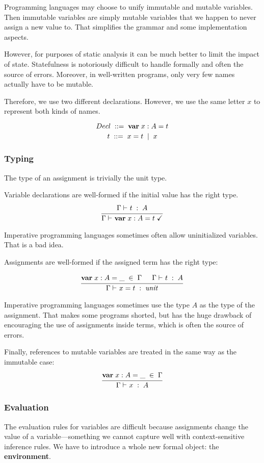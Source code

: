 Programming languages may choose to unify immutable and mutable variables.
Then immutable variables are simply mutable variables that we happen to never assign a new value to.
That simplifies the grammar and some implementation aspects.

However, for purposes of static analysis it can be much better to limit the impact of state.
Statefulness is notoriously difficult to handle formally and often the source of errors.
Moreover, in well-written programs, only very few names actually have to be mutable.

Therefore, we use two different declarations.
However, we use the same letter $x$ to represent both kinds of names.

\[Decl \;::=\; {\rm \bf var}\; x:A=t\]
\[t \;::=\; x=t \;\;|\;\; x\]

\subsubsection{Typing}

The type of an assignment is trivially the unit type.

Variable declarations are well-formed if the initial value has the right type.
\[\cfrac{\Gamma\vdash^{}_{}t\;:\;A}{\Gamma\vdash^{}_{}{\rm \bf var}\; x:A=t\;\checkmark}\,
\]

Imperative programming languages sometimes often allow uninitialized variables.
That is a bad idea.

Assignments are well-formed if the assigned term has the right type:

\[\cfrac{{\rm \bf var}\; x:A=\_ \;\in\;\Gamma \hspace*{.5cm} \Gamma\vdash^{}_{}t\;:\;A}{\Gamma\vdash^{}_{}x=t\;:\;\mathit{unit}}\,
\]

Imperative programming languages sometimes use the type $A$ as the type of the assignment.
That makes some programs shorted, but has the huge drawback of encouraging the use of assignments inside terms, which is often the source of errors.

Finally, references to mutable variables are treated in the same way as the immutable case:
\[\cfrac{{\rm \bf var}\; x:A=\_ \;\in\;\Gamma}{\Gamma\vdash^{}_{}x\;:\;A}\,
\]


\subsubsection{Evaluation}

The evaluation rules for variables are difficult because assignments change the value of a variable---something we cannot capture well with context-sensitive inference rules.
We have to introduce a whole new formal object: the \textbf{environment}.

